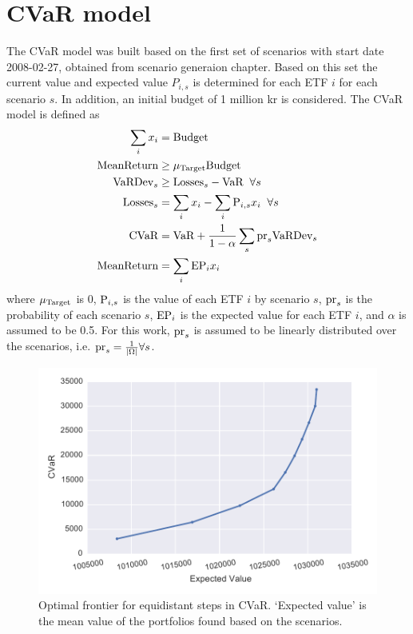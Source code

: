 \section{CVaR model}\label{sec:CVaR}

The CVaR model was built based on the first set of scenarios with start date 2008-02-27, obtained from scenario generaion chapter. 
Based on this set the current value and expected value $P_{i,s}$ is determined for each ETF $i$ for each scenario $s$.
In addition, an initial budget of 1 million kr is considered.  
The CVaR model is defined as
\begin{align}
\sum_{i} x_{i} &= \textup{Budget} \\
\textup{MeanReturn} &\ge \mu_{\textup{Target}} \textup{Budget} \\
\textup{VaRDev}_{s} &\ge \textup{Losses}_{s} - \textup{VaR} \; \; \forall s \label{eq:VarDev}\\
\textup{Losses}_{s} &= \sum_{i} x_{i} - \sum_{i} \textup{P}_{i,s} x_{i} \; \; \forall s \\
\textup{CVaR} &= \textup{VaR} + \frac{1} {1 - \alpha} \sum_{s} \textup{pr}_{s} \textup{VaRDev}_{s} \\
\textup{MeanReturn} &= \sum_{i} \textup{EP}_{i} x_{i} \label{eq:MeanReturn}
\end{align}
where $ \mu_{\textup{Target}}$ is 0, $\textup{P}_{i,s}$ is the value of each ETF $i$ by scenario $s$, $\textup{pr}_{s}$ is the probability of each scenario $s$, $\textup{EP}_{i}$ is the expected value for each ETF $i$, and $\alpha$ is assumed to be 0.5.
For this work, $\textup{pr}_{s}$ is assumed to be linearly distributed over the scenarios, i.e. $\textup{pr}_{s} = \frac{1}{|\Omega|} \forall s$.

\begin{figure}[tp]
\centering
\includegraphics{../pic/frontier.pdf}
\caption{Optimal frontier for equidistant steps in CVaR. `Expected value' is the mean value of the portfolios found based on the scenarios.}
\label{fig:frontier}
\end{figure}

